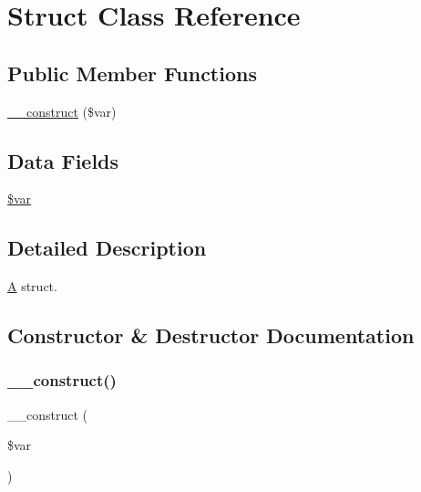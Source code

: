\hypertarget{class_sebastian_bergmann_1_1_comparator_1_1_struct}{}\section{Struct Class Reference}
\label{class_sebastian_bergmann_1_1_comparator_1_1_struct}
\subsection*{Public Member Functions}
\begin{DoxyCompactItemize}
\item 
\mbox{\hyperlink{class_sebastian_bergmann_1_1_comparator_1_1_struct_a68246bb3e0caa7ed453ea0ddf5795cb7}{\+\_\+\+\_\+construct}} (\$var)
\end{DoxyCompactItemize}
\subsection*{Data Fields}
\begin{DoxyCompactItemize}
\item 
\mbox{\hyperlink{class_sebastian_bergmann_1_1_comparator_1_1_struct_a9184c9cf1f1e58b87296500a3c3a9291}{\$var}}
\end{DoxyCompactItemize}


\subsection{Detailed Description}
\mbox{\hyperlink{class_a}{A}} struct. 

\subsection{Constructor \& Destructor Documentation}
\mbox{\label{class_sebastian_bergmann_1_1_comparator_1_1_struct_a68246bb3e0caa7ed453ea0ddf5795cb7}} 
\subsubsection{\texorpdfstring{\+\_\+\+\_\+construct()}{\_\_construct()}}
{\footnotesize\ttfamily \+\_\+\+\_\+construct (\begin{DoxyParamCaption}\item[{}]{\$var }\end{DoxyParamCaption})}



